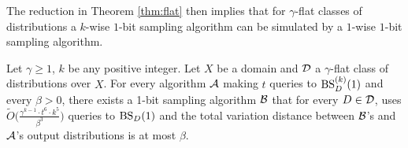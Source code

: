 The reduction in Theorem \ref{thm:flat} then implies that for $\gamma$-flat classes of distributions a $k$-wise $1$-bit sampling algorithm can be simulated by a $1$-wise $1$-bit sampling algorithm.
\begin{theorem}\label{thm:flat-1-bit}
Let $\gamma \geq 1$,  $k$ be any positive integer. Let $X$ be a domain and $\mathcal{D}$ a $\gamma$-flat class of distributions over $X$. For every algorithm $\mathcal{A}$ making $t$ queries to $\mbox{BS}^{(k)}_D(1)$ and every $\beta > 0$, there exists a 1-bit sampling algorithm $\mathcal{B}$ that for every $D\in \mathcal{D}$, uses $\tilde{O}\bigg(\frac{\gamma^{k-1}\cdot t^6 \cdot k^5 }{\beta^3} \bigg)$ queries to $\mbox{BS}_D(1)$ and the total variation distance between $\mathcal{B}$'s and $\mathcal{A}$'s output distributions is at most $\beta$.
\end{theorem}

